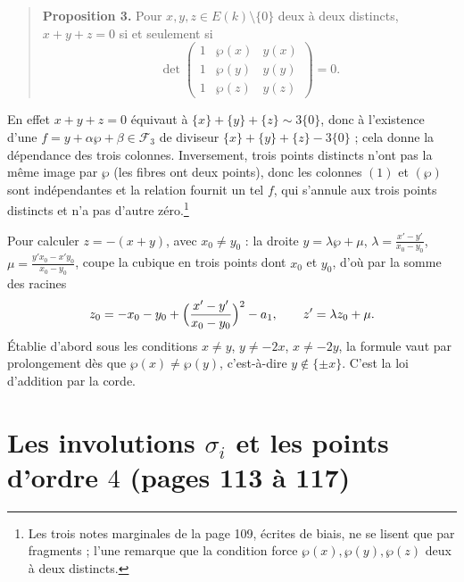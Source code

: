 \documentclass[11pt,a4paper]{article}
\begin{document}
\begin{quote}
\textbf{Proposition 3.} Pour $x, y, z \in E(k) \setminus \{0\}$ deux à deux
distincts, $x + y + z = 0$ si et seulement si
\[
\det \begin{pmatrix} 1 & \wp(x) & y(x) \\ 1 & \wp(y) & y(y) \\ 1 & \wp(z) & y(z)
\end{pmatrix} = 0 .
\]
\end{quote}
En effet $x + y + z = 0$ équivaut à $\{x\} + \{y\} + \{z\} \sim 3\{0\}$, donc à
l'existence d'une $f = y + \alpha \wp + \beta \in \mathcal{F}_3$ de diviseur
$\{x\} + \{y\} + \{z\} - 3\{0\}$ ; cela donne la dépendance des trois colonnes.
Inversement, trois points distincts n'ont pas la même image par $\wp$ (les
fibres ont deux points), donc les colonnes $(1)$ et $(\wp)$ sont indépendantes
et la relation fournit un tel $f$, qui s'annule aux trois points distincts et
n'a pas d'autre zéro.\footnote{Les trois notes marginales de la page 109,
écrites de biais, ne se lisent que par fragments ; l'une remarque que la
condition force $\wp(x), \wp(y), \wp(z)$ deux à deux distincts.}

Pour calculer $z = -(x + y)$, avec $x_0 \neq y_0$ : la droite $y = \lambda \wp +
\mu$, $\lambda = \frac{x' - y'}{x_0 - y_0}$, $\mu = \frac{y'x_0 - x'y_0}{x_0 -
y_0}$, coupe la cubique en trois points dont $x_0$ et $y_0$, d'où par la somme
des racines
\[
z_0 = -x_0 - y_0 + \Bigl( \frac{x' - y'}{x_0 - y_0} \Bigr)^2 - a_1, \qquad z' =
\lambda z_0 + \mu .
\]
Établie d'abord sous les conditions $x \neq y$, $y \neq -2x$, $x \neq -2y$, la
formule vaut par prolongement dès que $\wp(x) \neq \wp(y)$, c'est-à-dire $y
\notin \{\pm x\}$. C'est la loi d'addition par la corde.

\section*{Les involutions $\sigma_i$ et les points d'ordre $4$ (pages 113 à 117)}
\end{document}
